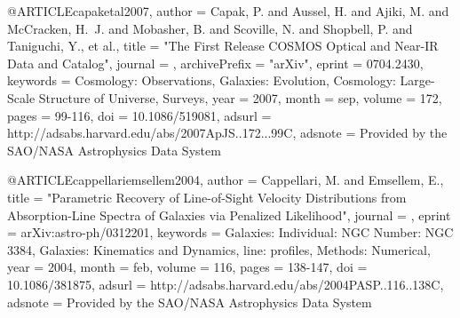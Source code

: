 {{{{{{{{{{{{@ARTICLE{capaketal2007,
   author = {{Capak}, P. and {Aussel}, H. and {Ajiki}, M. and {McCracken}, H.~J. and 
	{Mobasher}, B. and {Scoville}, N. and {Shopbell}, P. and {Taniguchi}, Y., et al.},
    title = "{The First Release COSMOS Optical and Near-IR Data and Catalog}",
  journal = {\apjs},
archivePrefix = "arXiv",
   eprint = {0704.2430},
 keywords = {Cosmology: Observations, Galaxies: Evolution, Cosmology: Large-Scale Structure of Universe, Surveys},
     year = 2007,
    month = sep,
   volume = 172,
    pages = {99-116},
      doi = {10.1086/519081},
   adsurl = {http://adsabs.harvard.edu/abs/2007ApJS..172...99C},
  adsnote = {Provided by the SAO/NASA Astrophysics Data System}
}

@ARTICLE{cappellariemsellem2004,
   author = {{Cappellari}, M. and {Emsellem}, E.},
    title = "{Parametric Recovery of Line-of-Sight Velocity Distributions from Absorption-Line Spectra of Galaxies via Penalized Likelihood}",
  journal = {\pasp},
   eprint = {arXiv:astro-ph/0312201},
 keywords = {Galaxies: Individual: NGC Number: NGC 3384, Galaxies: Kinematics and Dynamics, line: profiles, Methods: Numerical},
     year = 2004,
    month = feb,
   volume = 116,
    pages = {138-147},
      doi = {10.1086/381875},
   adsurl = {http://adsabs.harvard.edu/abs/2004PASP..116..138C},
  adsnote = {Provided by the SAO/NASA Astrophysics Data System}
}

}}}}}}}}}}}}
